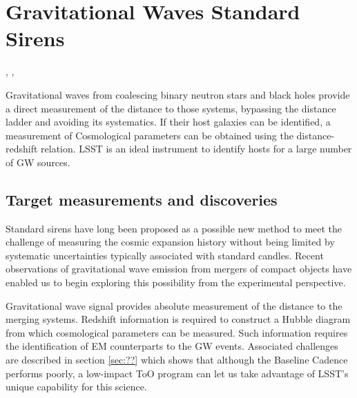 %
%
%

\section{Gravitational Waves Standard Sirens}
\def\secname{lenstimedelays}\label{sec:\secname}

,
, 

Gravitational waves from coalescing binary neutron stars and  
black holes provide a direct measurement of the 
distance to those systems, bypassing the distance ladder and 
avoiding its systematics. 
If their host galaxies can be identified, a measurement of Cosmological 
parameters can be obtained using the distance-redshift relation. 
LSST is an ideal instrument to identify hosts for a large number of  
GW sources. 


\subsection{Target measurements and discoveries}
\label{sec:\secname:targets}


Standard sirens have long been proposed as a possible new method to meet the challenge of 
measuring the cosmic expansion history without being limited by systematic uncertainties 
typically associated with standard candles. Recent observations of gravitational wave
emission from mergers of compact objects have enabled us to begin exploring this possibility
from the experimental perspective. 

Gravitational wave signal provides absolute measurement of the distance to 
the merging systems. Redshift information is required to construct a Hubble diagram 
from which cosmological parameters can be measured. Such information requires the 
identification of EM counterparts to the GW events. Associated challenges are
described in section \ref{sec:??} which shows that although the Baseline Cadence 
 performs poorly, a low-impact ToO program can let us take 
advantage of LSST's unique capability for this science. 

